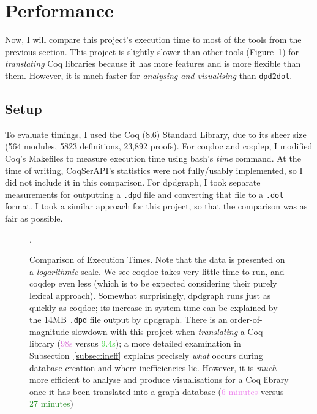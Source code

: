 \section{Performance}

Now, I will compare this project's execution time to most of the tools from the
previous section. This project is slightly slower than other tools
(Figure~\ref{fig:exectimes}) for \emph{translating} Coq libraries because it has
more features and is more flexible than them. However, it is much faster for
\emph{analysing and visualising} than \texttt{dpd2dot}.

\subsection{Setup}

To evaluate timings, I used the Coq (8.6) Standard Library, due to its sheer
size (564 modules, 5823 definitions, 23,892 proofs). For coqdoc and coqdep, I
modified Coq's Makefiles to measure execution time using bash's \emph{time}
command. At the time of writing, CoqSerAPI's statistics were not fully/usably
implemented, so I did not include it in this comparison. For dpdgraph, I took
separate measurements for outputting a \texttt{.dpd} file and converting that
file to a \texttt{.dot} format. I took a similar approach for this project, so
that the comparison was as fair as possible.

\begin{figure}[tp]
\centering

\caption{Comparison of Execution Times. Note that the data is presented on a
  \emph{logarithmic} scale. We see coqdoc takes very little time to run, and
  coqdep even less (which is to be expected considering their purely lexical
  approach). Somewhat surprisingly, dpdgraph runs just as quickly as coqdoc; its
  increase in system time can be explained by the 14MB \texttt{.dpd} file output
  by dpdgraph. There is an order-of-magnitude slowdown with this project when
  \emph{translating} a Coq library (\textcolor{Orchid}{98s} versus
  \textcolor{LimeGreen}{9.4s}); a more detailed examination in
  Subsection~\ref{subsec:ineff} explains precisely \emph{what} occurs during
  database creation and where inefficiencies lie. However, it is \emph{much}
  more efficient to analyse and produce visualisations for a Coq library once it
  has been translated into a graph database (\textcolor{violet}{6 minutes}
  versus \textcolor{ForestGreen}{27 minutes})}.\label{fig:exectimes}

\end{figure}

